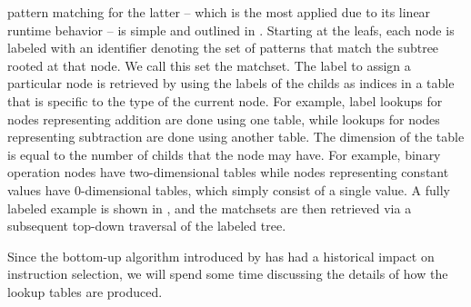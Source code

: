{\Gls{pattern matching} for the latter -- which is the most applied due to its
linear runtime behavior -- is simple and outlined in
.
%
Starting at the \glspl{leaf}, each
\gls{node} is labeled with an identifier denoting the set of \glspl{pattern}
that match the \gls{subtree} rooted at that \gls{node}.
%
We call this set the
\gls{matchset}.
%
The label to assign a particular \gls{node} is retrieved by
using the labels of the \glspl{child} as indices in a table that is specific to
the type of the current \gls{node}.
%
For example, label lookups for \glspl{node}
representing addition are done using one table, while lookups for \glspl{node}
representing subtraction are done using another table.
%
The dimension of the
table is equal to the number of \glspl{child} that the \gls{node} may have.
%
For
example, binary operation \glspl{node} have two-dimensional tables while
\glspl{node} representing constant values have \mbox{0-dimensional} tables,
which simply consist of a single value.
%
A fully labeled example is shown in
, and the \glspl{matchset} are
then retrieved via a subsequent top-down traversal of the labeled \gls{tree}.

%

Since the bottom-up algorithm introduced by \citeauthor{Hoffmann1982} has had a
historical impact on \gls{instruction selection}, we will spend some time
discussing the details of how the lookup tables are produced.


}
